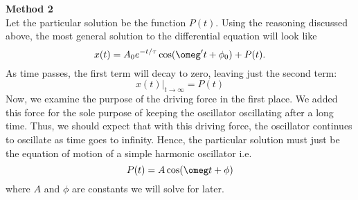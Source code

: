 \noindent \textbf{Method 2} \\
\noindent Let the particular solution be the function $P(t)$. Using the reasoning discussed above, the most general solution to the differential equation will look like
\begin{equation*}
    x(t) = A_0e^{-t/\tau}\cos(\omeg' t + \phi_0) + P(t).
\end{equation*}
\noindent As time passes, the first term will decay to zero, leaving just the second term:
\begin{equation*}
    x(t)|_{t\rightarrow\infty} = P(t)
\end{equation*}
\noindent Now, we examine the purpose of the driving force in the first place. We added this force for the sole purpose of keeping the oscillator oscillating after a long time. Thus, we should expect that with this driving force, the oscillator continues to oscillate as time goes to infinity. Hence, the particular solution must just be the equation of motion of a simple harmonic oscillator i.e.
\begin{equation*}
    P(t) = A\cos(\omeg t + \phi)
\end{equation*}
\noindent where $A$ and $\phi$ are constants we will solve for later.

